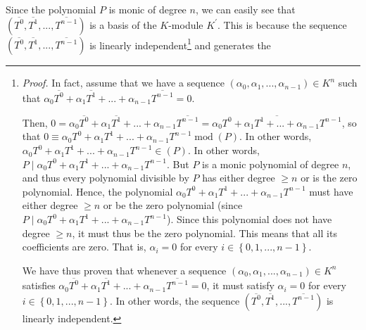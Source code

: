 \documentclass[numbers=enddot,12pt,final,onecolumn,notitlepage]{scrartcl}%
\begin{document}
Since the polynomial $P$ is monic of degree $n$, we can easily see that
$\left(  \overline{T^{0}},\overline{T^{1}},...,\overline{T^{n-1}}\right)  $ is
a basis of the $K$-module $K^{\prime}$. This is because the sequence $\left(
\overline{T^{0}},\overline{T^{1}},...,\overline{T^{n-1}}\right)  $ is linearly
independent\footnote{\textit{Proof.} In fact, assume that we have a sequence
$\left(  \alpha_{0},\alpha_{1},...,\alpha_{n-1}\right)  \in K^{n}$ such that
$\alpha_{0}\overline{T^{0}}+\alpha_{1}\overline{T^{1}}+...+\alpha
_{n-1}\overline{T^{n-1}}=0$.
\par
Then, $0=\alpha_{0}\overline{T^{0}}+\alpha_{1}\overline{T^{1}}+...+\alpha
_{n-1}\overline{T^{n-1}}=\overline{\alpha_{0}T^{0}+\alpha_{1}T^{1}%
+...+\alpha_{n-1}T^{n-1}}$, so that $0\equiv\alpha_{0}T^{0}+\alpha_{1}%
T^{1}+...+\alpha_{n-1}T^{n-1}\operatorname{mod}\left(  P\right)  $. In other
words, $\alpha_{0}T^{0}+\alpha_{1}T^{1}+...+\alpha_{n-1}T^{n-1}\in\left(
P\right)  $. In other words, $P\mid\alpha_{0}T^{0}+\alpha_{1}T^{1}%
+...+\alpha_{n-1}T^{n-1}$. But $P$ is a monic polynomial of degree $n$, and
thus every polynomial divisible by $P$ has either degree $\geq n$ or is the
zero polynomial. Hence, the polynomial $\alpha_{0}T^{0}+\alpha_{1}%
T^{1}+...+\alpha_{n-1}T^{n-1}$ must have either degree $\geq n$ or be the zero
polynomial (since $P\mid\alpha_{0}T^{0}+\alpha_{1}T^{1}+...+\alpha
_{n-1}T^{n-1}$). Since this polynomial does not have degree $\geq n$, it must
thus be the zero polynomial. This means that all its coefficients are zero.
That is, $\alpha_{i}=0$ for every $i\in\left\{  0,1,...,n-1\right\}  $.
\par
We have thus proven that whenever a sequence $\left(  \alpha_{0},\alpha
_{1},...,\alpha_{n-1}\right)  \in K^{n}$ satisfies $\alpha_{0}\overline{T^{0}%
}+\alpha_{1}\overline{T^{1}}+...+\alpha_{n-1}\overline{T^{n-1}}=0$, it must
satisfy $\alpha_{i}=0$ for every $i\in\left\{  0,1,...,n-1\right\}  $. In
other words, the sequence $\left(  \overline{T^{0}},\overline{T^{1}%
},...,\overline{T^{n-1}}\right)  $ is linearly independent.} and generates the
\end{document}
